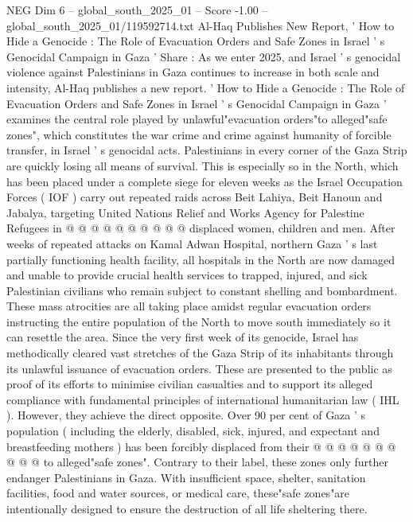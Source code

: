 \begin{textsample}{NEG Dim 6 – global\_south\_2025\_01 – Score -1.00 – global\_south\_2025\_01/119592714.txt}  \label{ex:f6_neg_007}
Al-Haq Publishes New Report, ' How to Hide a Genocide : The Role of Evacuation Orders and Safe Zones in Israel ' s Genocidal Campaign in Gaza ' Share : As we enter 2025, and Israel ' s genocidal violence against Palestinians in Gaza continues to increase in both scale and intensity, Al-Haq publishes a new report. ' How to Hide a Genocide : The Role of Evacuation Orders and Safe Zones in Israel ' s Genocidal Campaign in Gaza ' examines the central role played by unlawful"evacuation orders"to alleged"safe zones", which constitutes the war crime and crime against humanity of forcible transfer, in Israel ' s genocidal acts.
Palestinians in every corner of the Gaza Strip are quickly losing all means of survival.
This is especially so in the North, which has been placed under a complete siege for eleven weeks as the Israel Occupation Forces ( IOF ) carry out repeated raids across Beit Lahiya, Beit Hanoun and Jabalya, targeting United Nations Relief and Works Agency for Palestine Refugees in @ @ @ @ @ @ @ @ @ @ displaced women, children and men.
After weeks of repeated attacks on Kamal Adwan Hospital, northern Gaza ' s last partially functioning health facility, all hospitals in the North are now damaged and unable to provide crucial health services to trapped, injured, and sick Palestinian civilians who remain subject to constant shelling and bombardment.
These mass atrocities are all taking place amidst regular evacuation orders instructing the entire population of the North to move south immediately so it can resettle the area.
Since the very first week of its genocide, Israel has methodically cleared vast stretches of the Gaza Strip of its inhabitants through its unlawful issuance of evacuation orders.
These are presented to the public as proof of its efforts to minimise civilian casualties and to support its alleged compliance with fundamental principles of international humanitarian law ( IHL ).
However, they achieve the direct opposite.
Over 90 per cent of Gaza ' s population ( including the elderly, disabled, sick, injured, and expectant and breastfeeding mothers ) has been forcibly displaced from their @ @ @ @ @ @ @ @ @ @ to alleged"safe zones".
Contrary to their label, these zones only further endanger Palestinians in Gaza.
With insufficient space, shelter, sanitation facilities, food and water sources, or medical care, these"safe zones"are intentionally designed to ensure the destruction of all life sheltering there.

\end{textsample}
